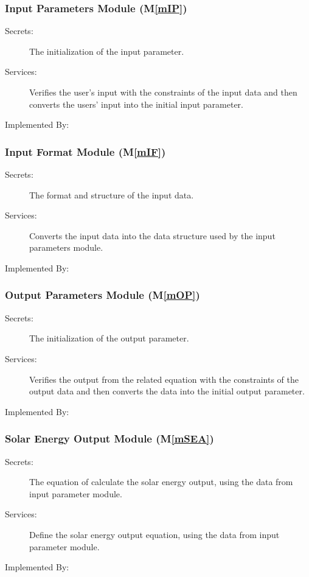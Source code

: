 \documentclass[12pt, titlepage]{article}
\newcommand{\mref}[1]{M\ref{#1}}
\begin{document}
\subsubsection{Input Parameters Module (\mref{mIP})}

\begin{description}
\item[Secrets:]The initialization of the input parameter.
\item[Services:]Verifies the user's input with the constraints of the input
data and then converts the users' input into the initial input parameter.
\item[Implemented By:] \progname
\end{description}

\subsubsection{Input Format Module (\mref{mIF})}

\begin{description}
\item[Secrets:]The format and structure of the input data.
\item[Services:]Converts the input data into the data structure used by the
  input parameters module.
\item[Implemented By:] \progname
\end{description}


\subsubsection{Output Parameters Module (\mref{mOP})}

\begin{description}
\item[Secrets:]The initialization of the output parameter.
\item[Services:]Verifies the output from the related equation with the
constraints of the output data and then converts the data into the initial 
output parameter.
\item[Implemented By:] \progname
\end{description}

\subsubsection{Solar Energy Output Module (\mref{mSEA})}

\begin{description}
\item[Secrets:] The equation of calculate the solar energy output, using the
data from input parameter module.
\item[Services:] Define the solar energy output equation, using the data from
input parameter module.
\item[Implemented By:] \progname
\end{description}
\end{document}
